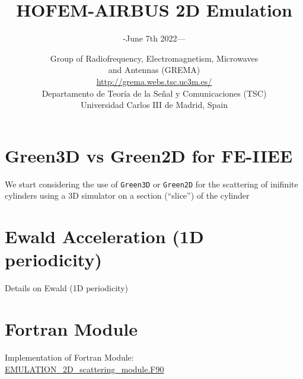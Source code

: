 \documentclass[smaller,xcolor=table,dvipsnames]{beamer}
\title[HOFEM-AIRBUS(v{\rcsInfoRevision})]{HOFEM-AIRBUS 2D Emulation}
\author[]{-June 7th 2022---}
\author{}
\date[]{\small{%
    Group of Radiofrequency, Electromagnetism, Microwaves \\ and Antennas (GREMA) \\    \url{http://grema.webs.tsc.uc3m.es/}
 \\[0.8\baselineskip]
    Departamento de Teoría de la Señal y Comunicaciones (TSC) \\
    Universidad Carlos III de Madrid, Spain \\
  }}
\institute{Contact: Luis Emilio García-Castillo
  \url{legcasti@ing.uc3m.es}, Adrián Amor \url{aamor@ing.uc3m.es}, Sergio Llorente \url{sllorent@ing.uc3m.es}}
\newcommand{\GreenT}{\texttt{Green3D}}
\newcommand{\GreenD}{\texttt{Green2D}}
\newcommand{\dirinputtex}{./inputtex}
\begin{document}
\begin{frame}
  \titlepage
\end{frame}




\section{Green3D vs Green2D for FE-IIEE}

  \begin{frame}[plain]
    \centering \Large{We start considering the use of {\GreenT} or
      {\GreenD} for the scattering of inifinite cylinders using a 3D
      simulator on a section (``slice'') of the cylinder}
    
  \end{frame}

  



  \section{Ewald Acceleration (1D periodicity)}
  \label{sec:Ewald1D}
  
  \begin{frame}[plain,label=Ewald1D]
    \centering    \Large{Details on Ewald (1D periodicity)}
  \end{frame}


  


\section{Fortran Module}

  \begin{frame}[plain]
    \centering    \Large{Implementation of Fortran Module:
      \\ \url{EMULATION_2D_scattering_module.F90}}
    
  \end{frame}
  
\end{document}
